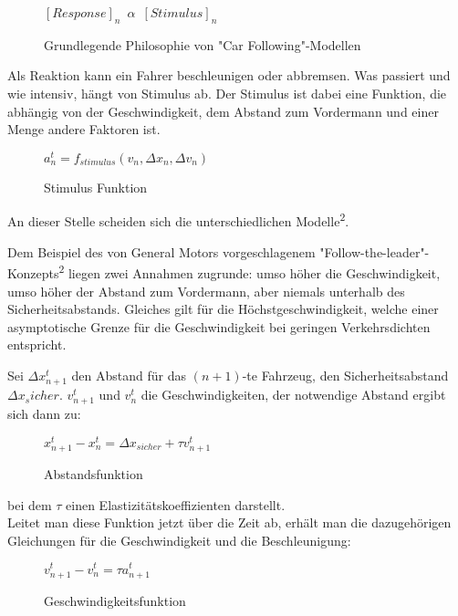 \begin{figure}[H]
    \centering
    \( [Response]_n\enspace\alpha\enspace[Stimulus]_n \)
    \caption{Grundlegende Philosophie von "Car Following"-Modellen}
    \label{fig:basic_principle_of_car_following_models}
\end{figure}

Als Reaktion kann ein Fahrer beschleunigen oder abbremsen. Was passiert und wie intensiv, hängt von Stimulus ab. Der Stimulus ist dabei eine Funktion, die abhängig von der Geschwindigkeit, dem Abstand zum Vordermann und einer Menge andere Faktoren ist. 

\begin{figure}[H]
    \centering
    \( a^t_n = f_{stimulus} (v_n, \Delta{x_n}, \Delta{v}_n) \)
    \caption{Stimulus Funktion}
    \label{fig:stimulus_function}
\end{figure}

An dieser Stelle scheiden sich die unterschiedlichen Modelle\textsuperscript{2}.

Dem Beispiel des von General Motors vorgeschlagenem "Follow-the-leader"-Konzepts\textsuperscript{2} liegen zwei Annahmen zugrunde: umso höher die Geschwindigkeit, umso höher der Abstand zum Vordermann, aber niemals unterhalb des Sicherheitsabstands. Gleiches gilt für die Höchstgeschwindigkeit, welche einer asymptotische Grenze für die Geschwindigkeit bei geringen Verkehrsdichten entspricht.

Sei \(\Delta{x^t_{n+1}}\) den Abstand für das \( (n+1) \)-te Fahrzeug, den Sicherheitsabstand \(\Delta{x}_sicher\). \(v_{n+1}^t\) und \(v_n^t\) die Geschwindigkeiten, der notwendige Abstand ergibt sich dann zu:

\begin{figure}[H]
    \centering
    \( x^t_{n+1} - x^t_n = \Delta{x_{sicher}} + \tau{v^t_{n+1}} \)
    \caption{Abstandsfunktion}
    \label{fig:distance_function}
\end{figure}

bei dem \( \tau \) einen Elastizitätskoeffizienten darstellt. \\

Leitet man diese Funktion jetzt über die Zeit ab, erhält man die dazugehörigen Gleichungen für die Geschwindigkeit und die Beschleunigung:

\begin{figure}[H]
    \centering
    \( v^t_{n+1} - v^t_n = \tau{a^t_{n+1}} \)
    \caption{Geschwindigkeitsfunktion}
    \label{fig:speed_function}
\end{figure}

